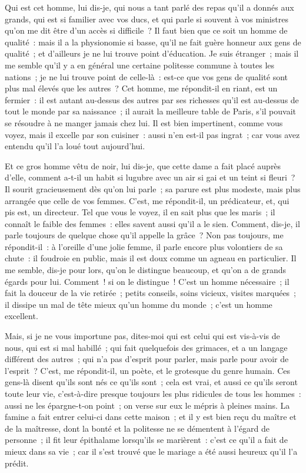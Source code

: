 \documentclass[french,twoside]{book} %
\begin{document}
Qui est cet homme, lui dis-je, qui nous a tant parlé des repas qu’il a donnés aux grands, qui est si familier avec vos ducs, et qui parle si souvent à vos ministres qu’on me dit être d’un accès si difficile ? Il faut bien que ce soit un homme de qualité : mais il a la physionomie si basse, qu’il ne fait guère honneur aux gens de qualité ; et d’ailleurs je ne lui trouve point d’éducation. Je suis étranger ; mais il me semble qu’il y a en général une certaine politesse commune à toutes les nations ; je ne lui trouve point de celle-là : est-ce que vos gens de qualité sont plus mal élevés que les autres ? Cet homme, me répondit-il en riant, est un fermier : il est autant au-dessus des autres par ses richesses qu’il est au-dessus de tout le monde par sa naissance ; il aurait la meilleure table de Paris, s’il pouvait se résoudre à ne manger jamais chez lui. Il est bien impertinent, comme vous voyez, mais il excelle par son cuisiner : aussi n’en est-il pas ingrat ; car vous avez entendu qu’il l’a loué tout aujourd’hui.\par
Et ce gros homme vêtu de noir, lui dis-je, que cette dame a fait placé auprès d’elle, comment a-t-il un habit si lugubre avec un air si gai et un teint si fleuri ? Il sourit gracieusement dès qu’on lui parle ; sa parure est plus modeste, mais plus arrangée que celle de vos femmes. C’est, me répondit-il, un prédicateur, et, qui pis est, un directeur. Tel que vous le voyez, il en sait plus que les maris ; il connaît le faible des femmes : elles savent aussi qu’il a le sien. Comment, dis-je, il parle toujours de quelque chose qu’il appelle la grâce ? Non pas toujours, me répondit-il : à l’oreille d’une jolie femme, il parle encore plus volontiers de sa chute : il foudroie en public, mais il est doux comme un agneau en particulier. Il me semble, dis-je pour lors, qu’on le distingue beaucoup, et qu’on a de grands égards pour lui. Comment ! si on le distingue ! C’est un homme nécessaire ; il fait la douceur de la vie retirée ; petits conseils, soins vicieux, visites marquées ; il dissipe un mal de tête mieux qu’un homme du monde ; c’est un homme excellent.\par
Mais, si je ne vous importune pas, dites-moi qui est celui qui est vis-à-vis de nous, qui est si mal habillé ; qui fait quelquefois des grimaces, et a un langage différent des autres ; qui n’a pas d’esprit pour parler, mais parle pour avoir de l’esprit ? C’est, me répondit-il, un poète, et le grotesque du genre humain. Ces gens-là disent qu’ils sont nés ce qu’ils sont ; cela est vrai, et aussi ce qu’ils seront toute leur vie, c’est-à-dire presque toujours les plus ridicules de tous les hommes : aussi ne les épargne-t-on point ; on verse sur eux le mépris à pleines mains. La famine a fait entrer celui-ci dans cette maison ; et il y est bien reçu du maître et de la maîtresse, dont la bonté et la politesse ne se démentent à l’égard de personne ; il fit leur épithalame lorsqu’ils se marièrent : c’est ce qu’il a fait de mieux dans sa vie ; car il s’est trouvé que le mariage a été aussi heureux qu’il l’a prédit.\par
\end{document}

